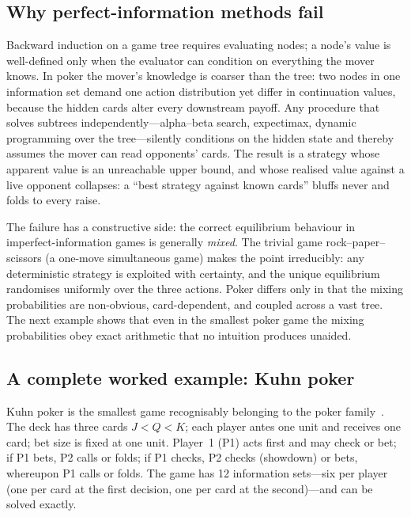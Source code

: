 \subsection{Why perfect-information methods fail}

Backward induction on a game tree requires evaluating nodes; a node's value is well-defined only when the evaluator can condition on everything the mover knows. In poker the mover's knowledge is coarser than the tree: two nodes in one information set demand one action distribution yet differ in continuation values, because the hidden cards alter every downstream payoff. Any procedure that solves subtrees independently---alpha--beta search, expectimax, dynamic programming over the tree---silently conditions on the hidden state and thereby assumes the mover can read opponents' cards. The result is a strategy whose apparent value is an unreachable upper bound, and whose realised value against a live opponent collapses: a ``best strategy against known cards'' bluffs never and folds to every raise.

The failure has a constructive side: the correct equilibrium behaviour in imperfect-information games is generally \emph{mixed}. The trivial game rock--paper--scissors (a one-move simultaneous game) makes the point irreducibly: any deterministic strategy is exploited with certainty, and the unique equilibrium randomises uniformly over the three actions. Poker differs only in that the mixing probabilities are non-obvious, card-dependent, and coupled across a vast tree. The next example shows that even in the smallest poker game the mixing probabilities obey exact arithmetic that no intuition produces unaided.

\subsection{A complete worked example: Kuhn poker}\label{sec:kuhn}

Kuhn poker is the smallest game recognisably belonging to the poker family~\cite{kuhn1953extensive}. The deck has three cards $J < Q < K$; each player antes one unit and receives one card; bet size is fixed at one unit. Player~1 (P1) acts first and may check or bet; if P1 bets, P2 calls or folds; if P1 checks, P2 checks (showdown) or bets, whereupon P1 calls or folds. The game has 12 information sets---six per player (one per card at the first decision, one per card at the second)---and can be solved exactly.

